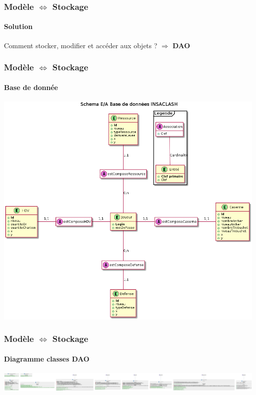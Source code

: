 \documentclass[aspectratio=169]{beamer}
\begin{document}
    \begin{frame}
        \frametitle{Modèle $\Leftrightarrow$ Stockage}
        \framesubtitle{Solution}
        \begin{center}
            Comment stocker, modifier et accéder aux objets ? $\Rightarrow$ \textbf{DAO}
        \end{center}
    \end{frame}
    \begin{frame}
        \frametitle{Modèle $\Leftrightarrow$ Stockage}
        \framesubtitle{Base de donnée}
        \begin{center}
            \includegraphics[scale=0.24]{images/bdd.png}
        \end{center}
    \end{frame}
    \begin{frame}
        \frametitle{Modèle $\Leftrightarrow$ Stockage}
        \framesubtitle{Diagramme classes DAO}
        \begin{center}
            \includegraphics[scale=0.13]{images/Classesdao.png}
        \end{center}
    \end{frame}
\end{document}
